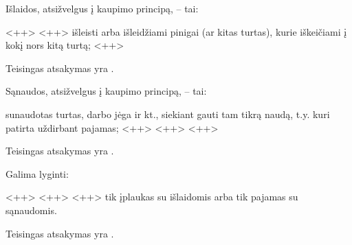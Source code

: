 \begin{tasks}
  \begin{task}
    \begin{condition}
      Išlaidos, atsižvelgus į kaupimo principą, – tai:
      \begin{enumerate}
         <++>
         <++>
         išleisti arba išleidžiami pinigai (ar kitas
          turtas), kurie iškeičiami į kokį nors kitą turtą;
         <++>
      \end{enumerate}
    \end{condition}
    \begin{solution}
      Teisingas atsakymas yra .
    \end{solution}
  \end{task}

  \begin{task}
    \begin{condition}
      Sąnaudos, atsižvelgus į kaupimo principą, – tai:
      \begin{enumerate}
         sunaudotas turtas, darbo jėga ir kt., siekiant gauti
          tam tikrą naudą, t.y. kuri patirta uždirbant pajamas;
         <++>
         <++>
         <++>
      \end{enumerate}
    \end{condition}
    \begin{solution}
      Teisingas atsakymas yra .
    \end{solution}
  \end{task}

  \begin{task}
    \begin{condition}
      Galima lyginti:
      \begin{enumerate}
         <++>
         <++>
         <++>
         tik įplaukas su išlaidomis arba tik pajamas su
          sąnaudomis.
      \end{enumerate}
    \end{condition}
    \begin{solution}
      Teisingas atsakymas yra .
    \end{solution}
  \end{task}
  
\end{tasks}

